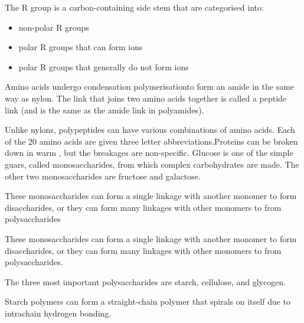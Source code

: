 		The R group is a carbon-containing side stem that are categorised into:

			\begin{itemize}
				\item non-polar R groups
				\item polar R groups that can form ions
				\item polar R groups that generally do not form ions
			\end{itemize}

		Amino acids undergo condensation polymerisationto form an amide in the same way as nylon. The link that joins two amino acids together is called a peptide link (and is the same as the amide link in polyamides).

		Unlike nylons, polypeptides can have various combinations of amino acids. Each of the 20 amino acids are given three letter abbreviations.Proteins can be broken down in warm , but the breakages are non-specific. Glucose is one of the simple guars, called monosaccharides, from which complex carbohydrates are made. The other two monosaccharides are fructose and galactose.

		These monosaccharides can form a single linkage with another monomer to form disaccharides, or they can form many linkages with other monomers to from polysaccharides

		These monosaccharides can form a single linkage with another monomer to form disaccharides, or they can form many linkages with other monomers to from polysaccharides.

		The three most important polysaccharides are starch, cellulose, and glycogen.

		Starch polymers can form a straight-chain polymer that spirals on itself due to intrachain hydrogen bonding.
